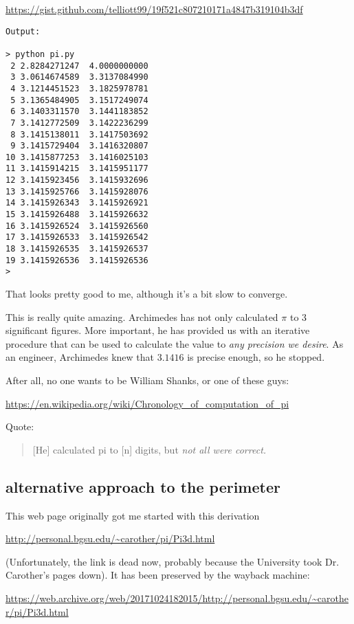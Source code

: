 \documentclass[11pt, oneside]{article}
\begin{document}
\url{https://gist.github.com/telliott99/19f521c807210171a4847b319104b3df}

\begin{verbatim}        
Output:

> python pi.py
 2 2.8284271247  4.0000000000
 3 3.0614674589  3.3137084990
 4 3.1214451523  3.1825978781
 5 3.1365484905  3.1517249074
 6 3.1403311570  3.1441183852
 7 3.1412772509  3.1422236299
 8 3.1415138011  3.1417503692
 9 3.1415729404  3.1416320807
10 3.1415877253  3.1416025103
11 3.1415914215  3.1415951177
12 3.1415923456  3.1415932696
13 3.1415925766  3.1415928076
14 3.1415926343  3.1415926921
15 3.1415926488  3.1415926632
16 3.1415926524  3.1415926560
17 3.1415926533  3.1415926542
18 3.1415926535  3.1415926537
19 3.1415926536  3.1415926536
> 
\end{verbatim}

That looks pretty good to me, although it's a bit slow to converge.

This is really quite amazing.  Archimedes has not only calculated $\pi$ to 3 significant figures.  More important, he has provided us with an iterative procedure that can be used to calculate the value to \emph{any precision we desire}.  As an engineer, Archimedes knew that $3.1416$ is precise enough, so he stopped.

After all, no one wants to be William Shanks, or one of these guys:

\url{https://en.wikipedia.org/wiki/Chronology_of_computation_of_pi}

Quote:

\begin{quote}[He] calculated pi to [n] digits, but \emph{not all were correct.}\end{quote}

\subsection*{alternative approach to the perimeter}

This web page originally got me started with this derivation

\url{http://personal.bgsu.edu/~carother/pi/Pi3d.html}

(Unfortunately, the link is dead now, probably because the University took Dr. Carother's pages down).  It has been preserved by the wayback machine:

\url{https://web.archive.org/web/20171024182015/http://personal.bgsu.edu/~carother/pi/Pi3d.html}
\end{document}
